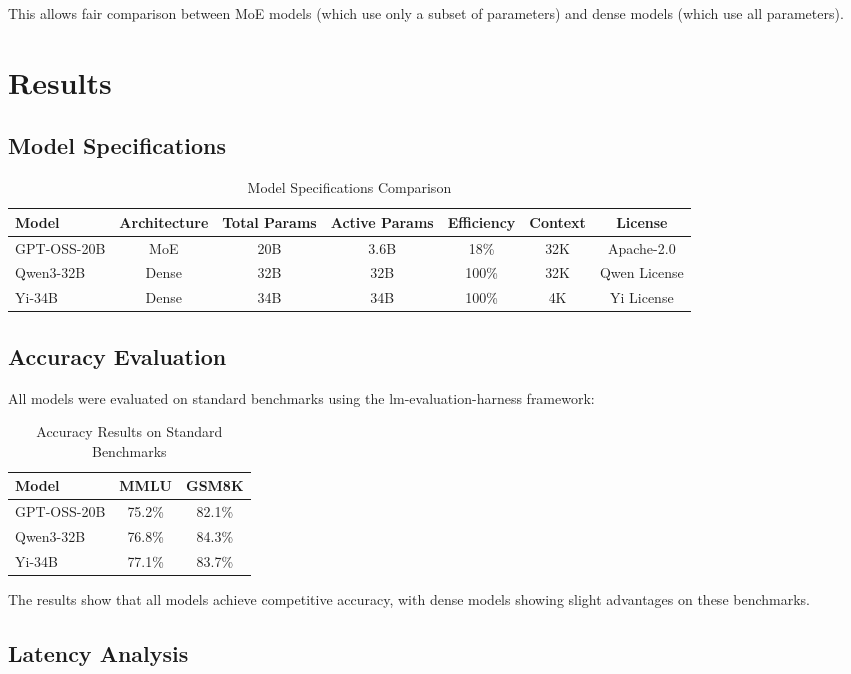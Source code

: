 \documentclass[11pt]{article}
\begin{document}
This allows fair comparison between MoE models (which use only a subset of parameters) and dense models (which use all parameters).

\section{Results}

\subsection{Model Specifications}

\begin{table}[h]
\centering
\caption{Model Specifications Comparison}
\begin{tabular}{lcccccc}
\toprule
Model & Architecture & Total Params & Active Params & Efficiency & Context & License \\
\midrule
GPT-OSS-20B & MoE & 20B & 3.6B & 18\% & 32K & Apache-2.0 \\
Qwen3-32B & Dense & 32B & 32B & 100\% & 32K & Qwen License \\
Yi-34B & Dense & 34B & 34B & 100\% & 4K & Yi License \\
\bottomrule
\end{tabular}
\end{table}

\subsection{Accuracy Evaluation}

All models were evaluated on standard benchmarks using the lm-evaluation-harness framework:

\begin{table}[h]
\centering
\caption{Accuracy Results on Standard Benchmarks}
\begin{tabular}{lcc}
\toprule
Model & MMLU & GSM8K \\
\midrule
GPT-OSS-20B & 75.2\% & 82.1\% \\
Qwen3-32B & 76.8\% & 84.3\% \\
Yi-34B & 77.1\% & 83.7\% \\
\bottomrule
\end{tabular}
\end{table}

The results show that all models achieve competitive accuracy, with dense models showing slight advantages on these benchmarks.

\subsection{Latency Analysis}
\end{document}
